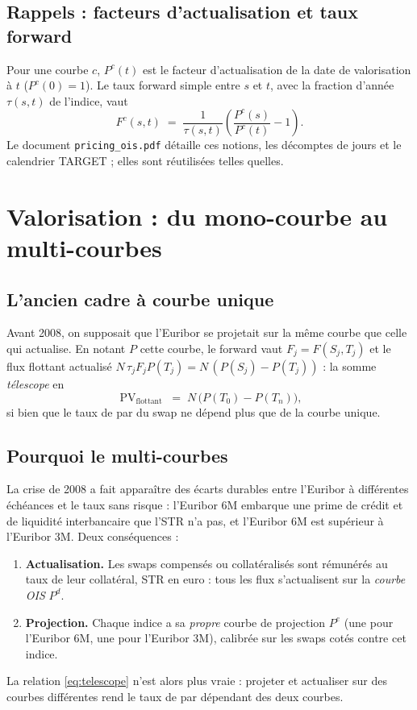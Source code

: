 \documentclass[11pt,a4paper]{article}
\newcommand{\estr}{\texorpdfstring{\texteuro STR}{EUR STR}}
\DeclareMathOperator{\PV}{PV}
\theoremstyle{plain}
\theoremstyle{definition}
\theoremstyle{remark}
\begin{document}
\subsection{Rappels : facteurs d'actualisation et taux forward}
Pour une courbe \(c\), \(P^c(t)\) est le facteur d'actualisation de la date de valorisation à \(t\)
(\(P^c(0)=1\)). Le taux forward simple entre \(s\) et \(t\), avec la fraction d'année \(\tau(s,t)\) de
l'indice, vaut
\begin{equation}
  F^c(s,t) \;=\; \frac{1}{\tau(s,t)}\left(\frac{P^c(s)}{P^c(t)} - 1\right).
  \label{eq:forward}
\end{equation}
Le document \texttt{pricing\_ois.pdf} détaille ces notions, les décomptes de jours et le calendrier
TARGET ; elles sont réutilisées telles quelles.

\section{Valorisation : du mono-courbe au multi-courbes}\label{sec:pricing}

\subsection{L'ancien cadre à courbe unique}
Avant 2008, on supposait que l'Euribor se projetait sur la même courbe que celle qui actualise. En
notant \(P\) cette courbe, le forward vaut \(F_j = F(S_j,T_j)\) et le flux flottant actualisé
\(N\,\tau_j F_j P(T_j) = N\,(P(S_j)-P(T_j))\) : la somme \emph{télescope} en
\begin{equation}
  \PV_{\mathrm{flottant}} \;=\; N\,\bigl(P(T_0) - P(T_n)\bigr),
  \label{eq:telescope}
\end{equation}
si bien que le taux de par du swap ne dépend plus que de la courbe unique.

\subsection{Pourquoi le multi-courbes}
La crise de 2008 a fait apparaître des écarts durables entre l'Euribor à différentes échéances et le
taux sans risque : l'Euribor 6M embarque une prime de crédit et de liquidité interbancaire que l'\estr{}
n'a pas, et l'Euribor 6M est supérieur à l'Euribor 3M. Deux conséquences :
\begin{enumerate}
  \item \textbf{Actualisation.} Les swaps compensés ou collatéralisés sont rémunérés au taux de leur
    collatéral, \estr{} en euro : tous les flux s'actualisent sur la \emph{courbe OIS} \(P^{d}\).
  \item \textbf{Projection.} Chaque indice a sa \emph{propre} courbe de projection \(P^{e}\) (une pour
    l'Euribor 6M, une pour l'Euribor 3M), calibrée sur les swaps cotés contre cet indice.
\end{enumerate}
La relation \eqref{eq:telescope} n'est alors plus vraie : projeter et actualiser sur des courbes
différentes rend le taux de par dépendant des deux courbes.
\end{document}
